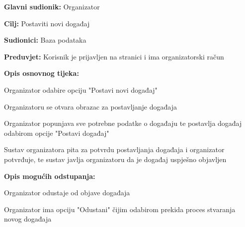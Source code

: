 					\noindent {}
\begin{packed_item}
	\item \textbf{Glavni sudionik:} Organizator
	\item  \textbf{Cilj:} Postaviti novi događaj
	\item  \textbf{Sudionici:} Baza podataka
	\item  \textbf{Preduvjet:} Korisnik je prijavljen na stranici i ima organizatorski račun
	\item  \textbf{Opis osnovnog tijeka:}
	
	\item[] \begin{packed_enum}
		
		\item Organizator odabire opciju "Postavi novi događaj"
		\item Organizatoru se otvara obrazac za postavljanje događaja
		\item Organizator popunjava sve potrebne podatke o događaju te postavlja događaj odabirom opcije "Postavi događaj"
		\item Sustav organizatora pita za potvrdu postavljanja događaja i organizator potvrđuje, te sustav javlja organizatoru da je događaj uspješno objavljen
	\end{packed_enum}
	
	\item  \textbf{Opis mogućih odstupanja:}
	
	\item[] \begin{packed_item}
		
		\item[4.a] Organizator odustaje od objave događaja
		\item[] \begin{packed_enum}
			
			\item Organizator ima opciju "Odustani" čijim odabirom prekida proces stvaranja novog događaja
			
		\end{packed_enum}
	\end{packed_item}
\end{packed_item}



